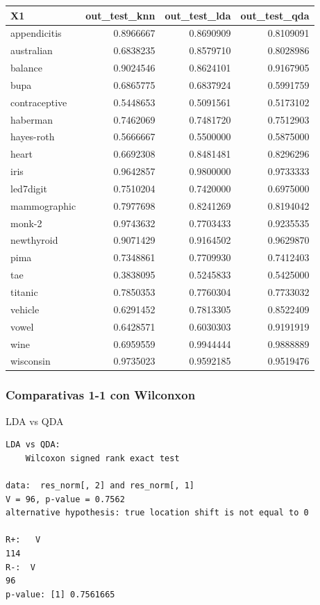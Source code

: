 \documentclass[
]{article}
\begin{document}
\begin{tabular}{l|r|r|r}
\hline
X1 & out\_test\_knn & out\_test\_lda & out\_test\_qda\\
\hline
appendicitis & 0.8966667 & 0.8690909 & 0.8109091\\
\hline
australian & 0.6838235 & 0.8579710 & 0.8028986\\
\hline
balance & 0.9024546 & 0.8624101 & 0.9167905\\
\hline
bupa & 0.6865775 & 0.6837924 & 0.5991759\\
\hline
contraceptive & 0.5448653 & 0.5091561 & 0.5173102\\
\hline
haberman & 0.7462069 & 0.7481720 & 0.7512903\\
\hline
hayes-roth & 0.5666667 & 0.5500000 & 0.5875000\\
\hline
heart & 0.6692308 & 0.8481481 & 0.8296296\\
\hline
iris & 0.9642857 & 0.9800000 & 0.9733333\\
\hline
led7digit & 0.7510204 & 0.7420000 & 0.6975000\\
\hline
mammographic & 0.7977698 & 0.8241269 & 0.8194042\\
\hline
monk-2 & 0.9743632 & 0.7703433 & 0.9235535\\
\hline
newthyroid & 0.9071429 & 0.9164502 & 0.9629870\\
\hline
pima & 0.7348861 & 0.7709930 & 0.7412403\\
\hline
tae & 0.3838095 & 0.5245833 & 0.5425000\\
\hline
titanic & 0.7850353 & 0.7760304 & 0.7733032\\
\hline
vehicle & 0.6291452 & 0.7813305 & 0.8522409\\
\hline
vowel & 0.6428571 & 0.6030303 & 0.9191919\\
\hline
wine & 0.6959559 & 0.9944444 & 0.9888889\\
\hline
wisconsin & 0.9735023 & 0.9592185 & 0.9519476\\
\hline
\end{tabular}

\hypertarget{comparativas-1-1-con-wilconxon}{%
\subsubsection{Comparativas 1-1 con
Wilconxon}\label{comparativas-1-1-con-wilconxon}}

LDA vs QDA

\begin{verbatim}
LDA vs QDA: 
    Wilcoxon signed rank exact test

data:  res_norm[, 2] and res_norm[, 1]
V = 96, p-value = 0.7562
alternative hypothesis: true location shift is not equal to 0

R+:   V 
114 
R-:  V 
96 
p-value: [1] 0.7561665
\end{verbatim}
\end{document}
